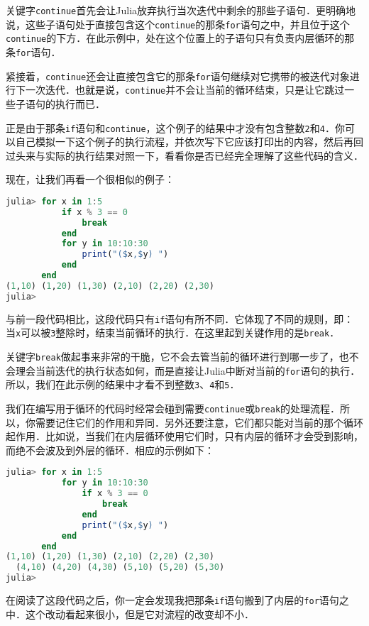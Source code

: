 关键字\verb|continue|首先会让Julia放弃执行当次迭代中剩余的那些子语句．更明确地说，这些子语句处于直接包含这个\verb|continue|的那条\verb|for|语句之中，并且位于这个\verb|continue|的下方．在此示例中，处在这个位置上的子语句只有负责内层循环的那条\verb|for|语句．

紧接着，\verb|continue|还会让直接包含它的那条\verb|for|语句继续对它携带的被迭代对象进行下一次迭代．也就是说，\verb|continue|并不会让当前的循环结束，只是让它跳过一些子语句的执行而已．

正是由于那条\verb|if|语句和\verb|continue|，这个例子的结果中才没有包含整数\verb|2|和\verb|4|．你可以自己模拟一下这个例子的执行流程，并依次写下它应该打印出的内容，然后再回过头来与实际的执行结果对照一下，看看你是否已经完全理解了这些代码的含义．

现在，让我们再看一个很相似的例子：
\begin{lstlisting}[language=julia]
julia> for x in 1:5
           if x % 3 == 0
               break
           end
           for y in 10:10:30
               print("($x,$y) ")
           end
       end
(1,10) (1,20) (1,30) (2,10) (2,20) (2,30) 
julia> 
\end{lstlisting}

与前一段代码相比，这段代码只有\verb|if|语句有所不同．它体现了不同的规则，即：当\verb|x|可以被\verb|3|整除时，结束当前循环的执行．在这里起到关键作用的是\verb|break|．

关键字\verb|break|做起事来非常的干脆，它不会去管当前的循环进行到哪一步了，也不会理会当前迭代的执行状态如何，而是直接让Julia中断对当前的\verb|for|语句的执行．所以，我们在此示例的结果中才看不到整数\verb|3|、\verb|4|和\verb|5|．

我们在编写用于循环的代码时经常会碰到需要\verb|continue|或\verb|break|的处理流程．所以，你需要记住它们的作用和异同．另外还要注意，它们都只能对当前的那个循环起作用．比如说，当我们在内层循环使用它们时，只有内层的循环才会受到影响，而绝不会波及到外层的循环．相应的示例如下：
\begin{lstlisting}[language=julia]
julia> for x in 1:5
           for y in 10:10:30
               if x % 3 == 0 
                   break
               end
               print("($x,$y) ")
           end
       end
(1,10) (1,20) (1,30) (2,10) (2,20) (2,30)
  (4,10) (4,20) (4,30) (5,10) (5,20) (5,30) 
julia> 
\end{lstlisting}

在阅读了这段代码之后，你一定会发现我把那条\verb|if|语句搬到了内层的\verb|for|语句之中．这个改动看起来很小，但是它对流程的改变却不小．

